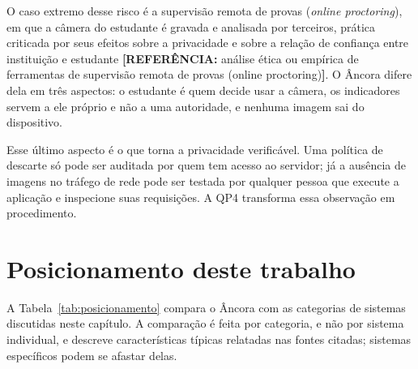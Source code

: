 \documentclass[portuguese,oneside]{tcc}
\newcommand{\ferramenta}{Âncora\xspace}
\newcommand{\estr}[1]{\emph{#1}}
\newcommand{\referencia}[1]{\textcolor{blue!60!black}{\textbf{[REFERÊNCIA:} #1\textbf{]}}}
\begin{document}
O caso extremo desse risco é a supervisão remota de provas (\estr{online proctoring}), em que a câmera do estudante é gravada e analisada por terceiros, prática criticada por seus efeitos sobre a privacidade e sobre a relação de confiança entre instituição e estudante \referencia{análise ética ou empírica de ferramentas de supervisão remota de provas (online proctoring)}. O \ferramenta difere dela em três aspectos: o estudante é quem decide usar a câmera, os indicadores servem a ele próprio e não a uma autoridade, e nenhuma imagem sai do dispositivo.

Esse último aspecto é o que torna a privacidade verificável. Uma política de descarte só pode ser auditada por quem tem acesso ao servidor; já a ausência de imagens no tráfego de rede pode ser testada por qualquer pessoa que execute a aplicação e inspecione suas requisições. A QP4 transforma essa observação em procedimento.

\section{\label{sec:posicionamento}Posicionamento deste trabalho}

A Tabela~\ref{tab:posicionamento} compara o \ferramenta com as categorias de sistemas discutidas neste capítulo. A comparação é feita por categoria, e não por sistema individual, e descreve características típicas relatadas nas fontes citadas; sistemas específicos podem se afastar delas.
\end{document}

